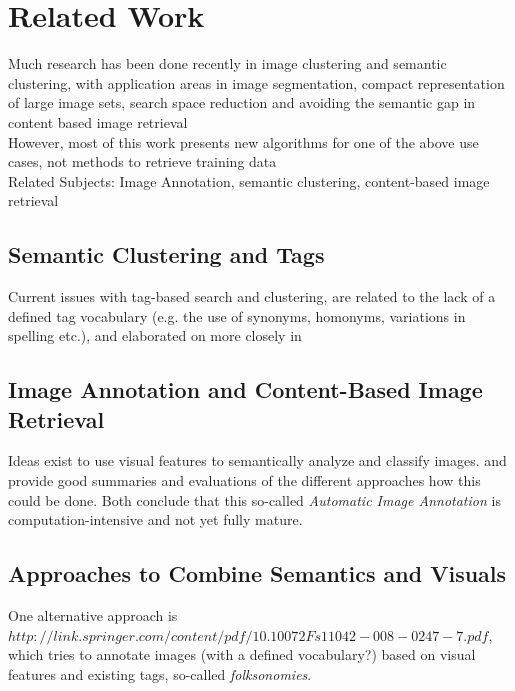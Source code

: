 \section{Related Work}
\label{sec_relatedwork}

Much research has been done recently in image clustering and semantic clustering, with application areas in image segmentation, compact representation of large image sets, search space reduction and avoiding the semantic gap in content based image retrieval \cite{Lim2011} \\
However, most of this work presents new algorithms for one of the above use cases, not methods to retrieve training data \\

Related Subjects: Image Annotation, semantic clustering, content-based image retrieval

\subsection{Semantic Clustering and Tags}
Current issues with tag-based search and clustering, are related to the lack of a defined tag vocabulary (e.g. the use of synonyms, homonyms, variations in spelling etc.), and elaborated on more closely in \cite{Auer2011}

\subsection{Image Annotation and Content-Based Image Retrieval}

Ideas exist to use visual features to semantically analyze and classify images. \cite{Liu2007} and \cite{Zhang2012} provide good summaries and evaluations of the different approaches how this could be done. Both conclude that this so-called \emph{Automatic Image Annotation}  is computation-intensive and not yet fully mature.

\subsection{Approaches to Combine Semantics and Visuals}

One alternative approach is $http://link.springer.com/content/pdf/10.1007 2Fs11042-008-0247-7.pdf$, which tries to annotate images (with a defined vocabulary?) based on visual features and existing tags, so-called \emph{folksonomies}.